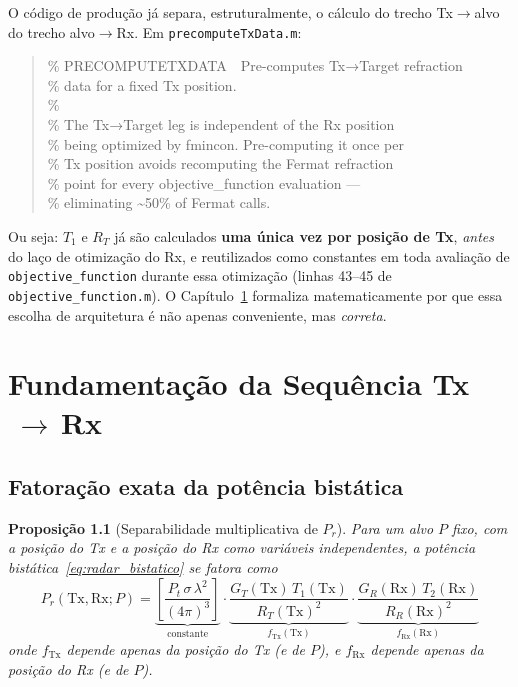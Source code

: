 \documentclass[12pt,a4paper,oneside]{book}
\newtheorem{proposicao}{Proposição}[chapter]
\theoremstyle{definition}
\theoremstyle{remark}
\newcommand{\RT}{R_T}
\newcommand{\RR}{R_R}
\newcommand{\Prcv}{P_r}
\newcommand{\Pt}{P_t}
\begin{document}
O código de produção já separa, estruturalmente, o cálculo do trecho
Tx$\to$alvo do trecho alvo$\to$Rx. Em \texttt{precomputeTxData.m}:

\begin{quote}\ttfamily\footnotesize
\% PRECOMPUTETXDATA\ \ Pre-computes Tx→Target refraction\\
\% data for a fixed Tx position.\\
\%\\
\% The Tx→Target leg is independent of the Rx position\\
\% being optimized by fmincon. Pre-computing it once per\\
\% Tx position avoids recomputing the Fermat refraction\\
\% point for every objective\_function evaluation ---\\
\% eliminating \textasciitilde 50\% of Fermat calls.
\end{quote}

Ou seja: $T_1$ e $\RT$ já são calculados \textbf{uma única vez por posição
de Tx}, \emph{antes} do laço de otimização do Rx, e reutilizados como
constantes em toda avaliação de \texttt{objective\_function} durante essa
otimização (linhas 43--45 de \texttt{objective\_function.m}). O
Capítulo~\ref{cap:fundamentacao} formaliza matematicamente por que essa
escolha de arquitetura é não apenas conveniente, mas \emph{correta}.

\chapter{Fundamentação da Sequência Tx$\,\to\,$Rx}
\label{cap:fundamentacao}

\section{Fatoração exata da potência bistática}

\begin{proposicao}[Separabilidade multiplicativa de $\Prcv$]
\label{prop:separabilidade}
Para um alvo $P$ fixo, com a posição do Tx e a posição do Rx como variáveis
independentes, a potência bistática~\eqref{eq:radar_bistatico} se fatora
como
\begin{equation}
  \Prcv(\mathrm{Tx},\mathrm{Rx};P) = \underbrace{\left[\frac{\Pt\,\sigma\,\lambda^2}{(4\pi)^3}\right]}_{\text{constante}}
  \cdot\underbrace{\frac{G_T(\mathrm{Tx})\,T_1(\mathrm{Tx})}{\RT(\mathrm{Tx})^2}}_{f_{\mathrm{Tx}}(\mathrm{Tx})}
  \cdot\underbrace{\frac{G_R(\mathrm{Rx})\,T_2(\mathrm{Rx})}{\RR(\mathrm{Rx})^2}}_{f_{\mathrm{Rx}}(\mathrm{Rx})}
  \label{eq:fatoracao}
\end{equation}
onde $f_{\mathrm{Tx}}$ depende \emph{apenas} da posição do Tx (e de $P$), e
$f_{\mathrm{Rx}}$ depende \emph{apenas} da posição do Rx (e de $P$).
\end{proposicao}
\end{document}
